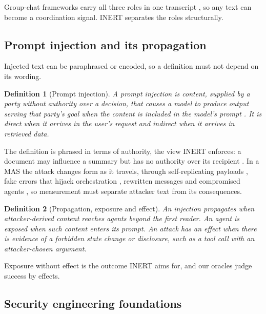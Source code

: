 \documentclass[pdflatex,sn-mathphys-num]{sn-jnl}
\theoremstyle{thmstyleone}%
\theoremstyle{thmstyletwo}%
\theoremstyle{thmstylethree}%
\newtheorem{definition}{Definition}%
\begin{document}
Group-chat frameworks carry all three roles in one transcript \citep{wu2023autogen}, so any text can become a coordination signal. INERT separates the roles structurally.

\subsection{Prompt injection and its propagation}\label{sec:bg-pi}

Injected text can be paraphrased or encoded, so a definition must not depend on its wording.

\begin{definition}[Prompt injection]\label{def:pi}
A \emph{prompt injection} is content, supplied by a party without authority over a decision, that causes a model to produce output serving that party's goal when the content is included in the model's prompt \citep{perez2022ignore,greshake2023indirect,liu2024formalizing}. It is \emph{direct} when it arrives in the user's request and \emph{indirect} when it arrives in retrieved data.
\end{definition}

The definition is phrased in terms of authority, the view INERT enforces: a document may influence a summary but has no authority over its recipient \citep{debenedetti2025camel}. In a MAS the attack changes form as it travels, through self-replicating payloads \citep{lee2024promptinfection}, fake errors that hijack orchestration \citep{triedman2025mas}, rewritten messages \citep{he2025aitm} and compromised agents \citep{kavathekar2025tamas}, so measurement must separate attacker text from its consequences.

\begin{definition}[Propagation, exposure and effect]\label{def:effect}
An injection \emph{propagates} when attacker-derived content reaches agents beyond the first reader. An agent is \emph{exposed} when such content enters its prompt. An attack has an \emph{effect} when there is evidence of a forbidden state change or disclosure, such as a tool call with an attacker-chosen argument.
\end{definition}

Exposure without effect is the outcome INERT aims for, and our oracles judge success by effects.

\subsection{Security engineering foundations}\label{sec:bg-sec}
\end{document}
